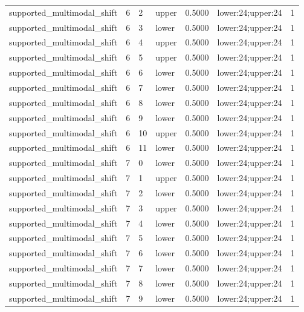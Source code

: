 \documentclass{article}
\begin{document}
\begin{table}[tbp]
{\begin{tabular}{lllllll}
supported\_multimodal\_shift & 6 & 2 & upper & 0.5000 & lower:24;upper:24 & 1 \\
supported\_multimodal\_shift & 6 & 3 & lower & 0.5000 & lower:24;upper:24 & 1 \\
supported\_multimodal\_shift & 6 & 4 & upper & 0.5000 & lower:24;upper:24 & 1 \\
supported\_multimodal\_shift & 6 & 5 & upper & 0.5000 & lower:24;upper:24 & 1 \\
supported\_multimodal\_shift & 6 & 6 & lower & 0.5000 & lower:24;upper:24 & 1 \\
supported\_multimodal\_shift & 6 & 7 & lower & 0.5000 & lower:24;upper:24 & 1 \\
supported\_multimodal\_shift & 6 & 8 & lower & 0.5000 & lower:24;upper:24 & 1 \\
supported\_multimodal\_shift & 6 & 9 & lower & 0.5000 & lower:24;upper:24 & 1 \\
supported\_multimodal\_shift & 6 & 10 & upper & 0.5000 & lower:24;upper:24 & 1 \\
supported\_multimodal\_shift & 6 & 11 & lower & 0.5000 & lower:24;upper:24 & 1 \\
supported\_multimodal\_shift & 7 & 0 & lower & 0.5000 & lower:24;upper:24 & 1 \\
supported\_multimodal\_shift & 7 & 1 & upper & 0.5000 & lower:24;upper:24 & 1 \\
supported\_multimodal\_shift & 7 & 2 & lower & 0.5000 & lower:24;upper:24 & 1 \\
supported\_multimodal\_shift & 7 & 3 & upper & 0.5000 & lower:24;upper:24 & 1 \\
supported\_multimodal\_shift & 7 & 4 & lower & 0.5000 & lower:24;upper:24 & 1 \\
supported\_multimodal\_shift & 7 & 5 & lower & 0.5000 & lower:24;upper:24 & 1 \\
supported\_multimodal\_shift & 7 & 6 & lower & 0.5000 & lower:24;upper:24 & 1 \\
supported\_multimodal\_shift & 7 & 7 & lower & 0.5000 & lower:24;upper:24 & 1 \\
supported\_multimodal\_shift & 7 & 8 & lower & 0.5000 & lower:24;upper:24 & 1 \\
supported\_multimodal\_shift & 7 & 9 & lower & 0.5000 & lower:24;upper:24 & 1 \\
\bottomrule
\end{tabular}
}
\end{table}

\clearpage
\end{document}
